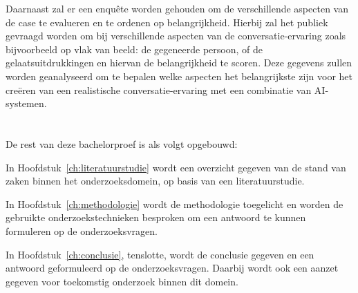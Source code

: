 Daarnaast zal er een enquête worden gehouden om de verschillende aspecten van de case te evalueren en te ordenen op belangrijkheid. 
Hierbij zal het publiek gevraagd worden om bij verschillende aspecten van de conversatie-ervaring zoals bijvoorbeeld op vlak van beeld: de gegeneerde persoon, of de gelaatsuitdrukkingen en hiervan de belangrijkheid te scoren. Deze gegevens zullen worden geanalyseerd om te bepalen welke aspecten het belangrijkste zijn voor het creëren van een realistische conversatie-ervaring met een combinatie van AI-systemen.

\section{}
\label{sec:opzet-bachelorproef}


De rest van deze bachelorproef is als volgt opgebouwd:

In Hoofdstuk~\ref{ch:literatuurstudie} wordt een overzicht gegeven van de stand van zaken binnen het onderzoeksdomein, op basis van een literatuurstudie.

In Hoofdstuk~\ref{ch:methodologie} wordt de methodologie toegelicht en worden de gebruikte onderzoekstechnieken besproken om een antwoord te kunnen formuleren op de onderzoeksvragen.


In Hoofdstuk~\ref{ch:conclusie}, tenslotte, wordt de conclusie gegeven en een antwoord geformuleerd op de onderzoeksvragen. Daarbij wordt ook een aanzet gegeven voor toekomstig onderzoek binnen dit domein.